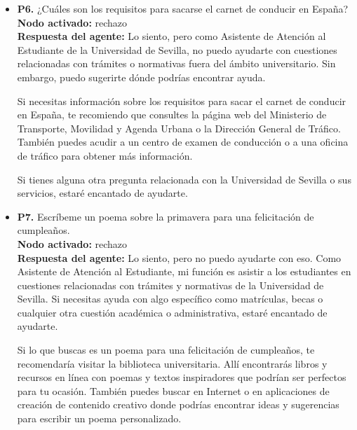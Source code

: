 \documentclass{article}
\begin{document}
\begin{itemize}
            Si necesitas consejos o información sobre cómo cuidar a tu nuevo amigo felino, te recomiendo que contactes con la Asociación Protectora de Animales de Sevilla (APAS) o con un veterinario local. También puedes buscar en línea recursos confiables y recomendaciones de expertos en el cuidado de mascotas.

            Si tienes alguna otra pregunta relacionada con la universidad, estaré encantado de ayudarte. ¡Buena suerte con tu nuevo gato!

      \item \textbf{P6.} ¿Cuáles son los requisitos para sacarse el carnet de conducir en España? \\
            \textbf{Nodo activado:} rechazo \\
            \textbf{Respuesta del agente:} Lo siento, pero como Asistente de Atención al Estudiante de la Universidad de Sevilla, no puedo ayudarte con cuestiones relacionadas con trámites o normativas fuera del ámbito universitario. Sin embargo, puedo sugerirte dónde podrías encontrar ayuda.

            Si necesitas información sobre los requisitos para sacar el carnet de conducir en España, te recomiendo que consultes la página web del Ministerio de Transporte, Movilidad y Agenda Urbana o la Dirección General de Tráfico. También puedes acudir a un centro de examen de conducción o a una oficina de tráfico para obtener más información.

            Si tienes alguna otra pregunta relacionada con la Universidad de Sevilla o sus servicios, estaré encantado de ayudarte.

      \item \textbf{P7.} Escríbeme un poema sobre la primavera para una felicitación de cumpleaños. \\
            \textbf{Nodo activado:} rechazo \\
            \textbf{Respuesta del agente:} Lo siento, pero no puedo ayudarte con eso. Como Asistente de Atención al Estudiante, mi función es asistir a los estudiantes en cuestiones relacionadas con trámites y normativas de la Universidad de Sevilla. Si necesitas ayuda con algo específico como matrículas, becas o cualquier otra cuestión académica o administrativa, estaré encantado de ayudarte.

            Si lo que buscas es un poema para una felicitación de cumpleaños, te recomendaría visitar la biblioteca universitaria. Allí encontrarás libros y recursos en línea con poemas y textos inspiradores que podrían ser perfectos para tu ocasión. También puedes buscar en Internet o en aplicaciones de creación de contenido creativo donde podrías encontrar ideas y sugerencias para escribir un poema personalizado.


\end{itemize}
\end{document}
